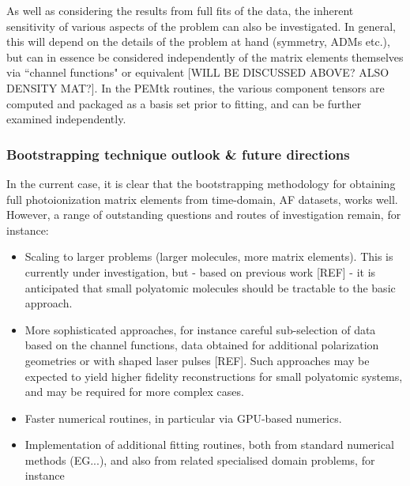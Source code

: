 As well as considering the results from full fits of the data, the inherent sensitivity of various aspects of the problem can also be investigated. In general, this will depend on the details of the problem at hand (symmetry, ADMs etc.), but can in essence be considered independently of the matrix elements themselves via ``channel functions" or equivalent [WILL BE DISCUSSED ABOVE? ALSO DENSITY MAT?]. In the PEMtk routines, the various component tensors are computed and packaged as a basis set prior to fitting, and can be further examined independently.


\subsubsection{Bootstrapping technique outlook \& future directions}

In the current case, it is clear that the bootstrapping methodology for obtaining full photoionization matrix elements from time-domain, AF datasets, works well. However, a range of outstanding questions and routes of investigation remain, for instance:

\begin{itemize}
\item Scaling to larger problems (larger molecules, more matrix elements). This is currently under investigation, but - based on previous work [REF] - it is anticipated that small polyatomic molecules should be tractable to the basic approach. 
\item More sophisticated approaches, for instance careful sub-selection of data based on the channel functions, data obtained for additional polarization geometries or with shaped laser pulses [REF]. Such approaches may be expected to yield higher fidelity reconstructions for small polyatomic systems, and may be required for more complex cases.
\item Faster numerical routines, in particular via GPU-based numerics.
\item Implementation of additional fitting routines, both from standard numerical methods (EG...), and also from related specialised domain problems, for instance 
\end{itemize}
